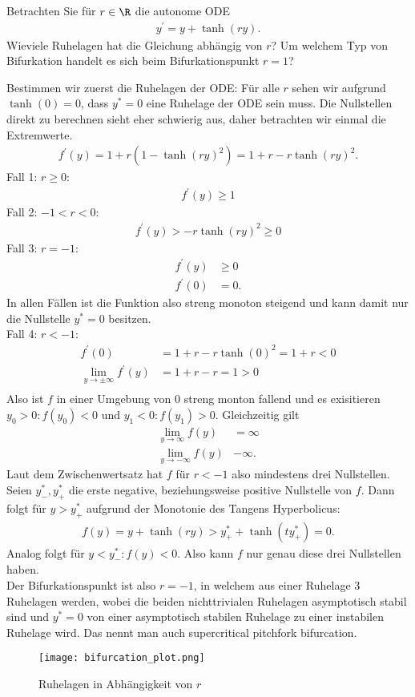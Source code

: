 \begin{exercise}
Betrachten Sie für $r \in \R$ die autonome ODE
\begin{align*}
  y^{\prime} = y + \tanh(ry).
\end{align*}
Wieviele Ruhelagen hat die Gleichung abhängig von $r$? Um welchem Typ von Bifurkation
handelt es sich beim Bifurkationspunkt $r = 1$?
\end{exercise}
\begin{solution}
Bestimmen wir zuerst die Ruhelagen der ODE:
Für alle $r$ sehen wir aufgrund $\tanh(0) = 0$, dass $y^* = 0$ eine Ruhelage der ODE
sein muss.
Die Nullstellen direkt zu berechnen sieht eher schwierig aus, daher betrachten wir
einmal die Extremwerte.
\begin{align*}
  f^{\prime}(y) = 1 + r(1 - \tanh(ry)^2) = 1 + r - r\tanh(ry)^2.
\end{align*}
Fall 1: $r \geq 0:$
\begin{align*}
  f^{\prime}(y) \geq 1
\end{align*}
Fall 2: $-1 < r < 0$:
\begin{align*}
  f^{\prime}(y) > -r\tanh(ry)^2 \geq 0
\end{align*}
Fall 3: $r = -1$:
\begin{align*}
  f^{\prime}(y) &\geq 0 \\
  f^{\prime}(0) &= 0.
\end{align*}
In allen Fällen ist die Funktion also streng monoton steigend und kann damit
nur die Nullstelle $y^* = 0$ besitzen. \\
Fall 4: $r < -1$:
\begin{align*}
  f^{\prime}(0) &= 1 + r - r\tanh(0)^2 = 1 + r < 0 \\
  \lim_{y \to \pm\infty}f^{\prime}(y) &= 1 + r - r = 1 > 0 \\
\end{align*}
Also ist $f$ in einer Umgebung von $0$ streng monton fallend und es exisitieren
$y_0 > 0: f(y_0) < 0$ und $y_1 < 0: f(y_1) > 0$. Gleichzeitig gilt
\begin{align*}
  \lim_{y \to \infty} f(y) &= \infty \\
  \lim_{y \to -\infty} f(y) & -\infty.
\end{align*}
Laut dem Zwischenwertsatz hat $f$ für $r < -1$ also mindestens drei Nullstellen.
Seien $y_-^*,y_+^*$ die erste negative, beziehungsweise positive Nullstelle von $f$.
Dann folgt für $y > y_+^*$ aufgrund der Monotonie des Tangens Hyperbolicus:
\begin{align*}
  f(y) = y + \tanh(ry) > y_+^* + \tanh(ty_+^*) = 0.
\end{align*}
Analog folgt für $y < y_-^*: f(y) < 0$. Also kann $f$ nur genau diese drei Nullstellen haben. \\
Der Bifurkationspunkt ist also $r = -1$, in welchem aus einer Ruhelage 3 Ruhelagen werden,
wobei die beiden nichttrivialen Ruhelagen asymptotisch stabil sind und $y^* = 0$
von einer asymptotisch stabilen Ruhelage zu einer instabilen Ruhelage wird.
Das nennt man auch \glqq supercritical pitchfork bifurcation\grqq. \\

\begin{figure}
    \centering
    \texttt{[image: bifurcation\_plot.png]}
    \caption{Ruhelagen in Abhängigkeit von $r$}
\end{figure}
\end{solution}
